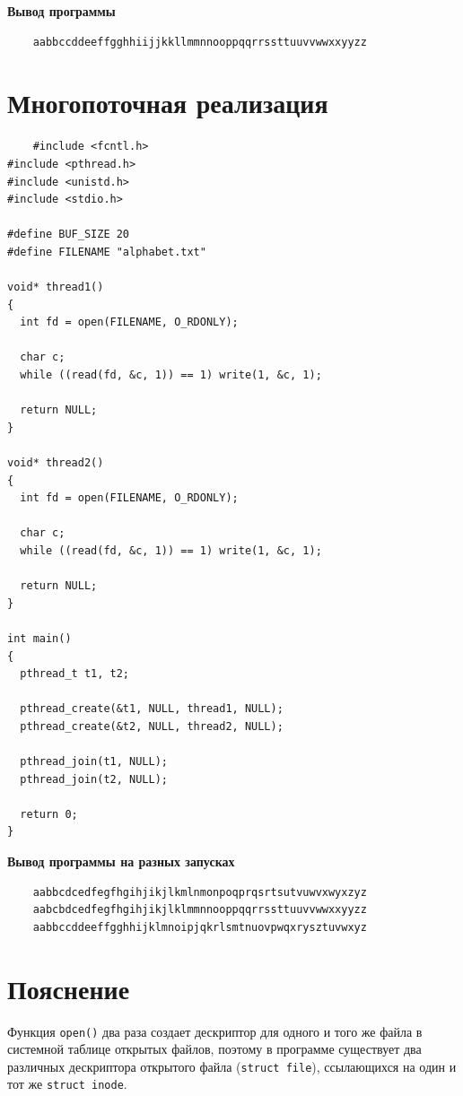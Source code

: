 \textbf{Вывод программы}

\begin{lstlisting}
	aabbccddeeffgghhiijjkkllmmnnooppqqrrssttuuvvwwxxyyzz
\end{lstlisting}

\section{Многопоточная реализация}

\begin{lstlisting}
	#include <fcntl.h>
#include <pthread.h>
#include <unistd.h>
#include <stdio.h>

#define BUF_SIZE 20
#define FILENAME "alphabet.txt"

void* thread1()
{
  int fd = open(FILENAME, O_RDONLY);

  char c;
  while ((read(fd, &c, 1)) == 1) write(1, &c, 1);

  return NULL;
}

void* thread2()
{
  int fd = open(FILENAME, O_RDONLY);

  char c;
  while ((read(fd, &c, 1)) == 1) write(1, &c, 1);

  return NULL;
}

int main()
{
  pthread_t t1, t2;

  pthread_create(&t1, NULL, thread1, NULL);
  pthread_create(&t2, NULL, thread2, NULL);

  pthread_join(t1, NULL);
  pthread_join(t2, NULL);

  return 0;
}
\end{lstlisting}

\textbf{Вывод программы на разных запусках}

\begin{lstlisting}
	aabbcdcedfegfhgihjikjlkmlnmonpoqprqsrtsutvuwvxwyxzyz
	aabcbdcedfegfhgihjikjlklmmnnooppqqrrssttuuvvwwxxyyzz
	aabbccddeeffgghhijklmnoipjqkrlsmtnuovpwqxrysztuvwxyz
\end{lstlisting}

\section{Пояснение}

Функция \texttt{open()} два раза создает дескриптор для одного и того же файла в системной таблице открытых файлов, поэтому в программе существует два различных дескриптора открытого файла (\texttt{struct file}), ссылающихся на один	и тот же \texttt{struct inode}.
	
